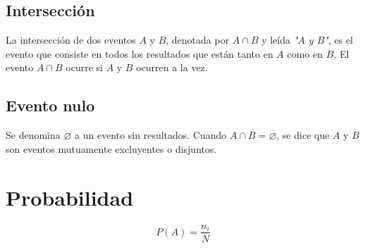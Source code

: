 \documentclass{report}
\begin{document}
      \subsection*{Intersección}
      La intersección de dos eventos $A$ y $B$, denotada por $A\cap B$ y leída 
      \textit{"$A$ y $B$"}, es el evento que consiste en todos los resultados 
      que están tanto en $A$ como en $B$. El evento $A\cap B$ ocurre si $A$ y
      $B$ ocurren a la vez.

      \subsection*{Evento nulo}
      Se denomina $\varnothing$ a un evento sin resultados. Cuando $A\cap B=\varnothing$, se dice que 
      $A$ y $B$ son eventos mutuamente excluyentes o disjuntos.

    \section*{Probabilidad}
    
    \begin{equation*}
      P(A)=\frac{n_i}{N}
    \end{equation*}
\end{document}
